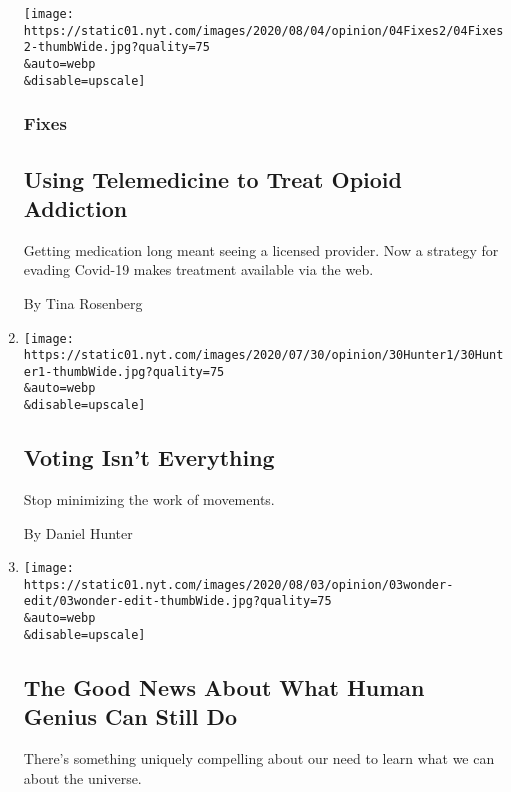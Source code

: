 \begin{enumerate}
  \texttt{[image: https://static01.nyt.com/images/2020/08/04/opinion/04Fixes2/04Fixes2-thumbWide.jpg?quality=75\\\&auto=webp\\\&disable=upscale]}

  \hypertarget{fixes}{%
  \subsubsection{Fixes}\label{fixes}}

  \hypertarget{using-telemedicine-to-treat-opioid-addiction}{%
  \subsection{Using Telemedicine to Treat Opioid
  Addiction}\label{using-telemedicine-to-treat-opioid-addiction}}

  Getting medication long meant seeing a licensed provider. Now a
  strategy for evading Covid-19 makes treatment available via the web.

  By Tina Rosenberg
\item
  \href{/2020/08/04/opinion/voting-2020-election-blm-movement.html}{}

  \texttt{[image: https://static01.nyt.com/images/2020/07/30/opinion/30Hunter1/30Hunter1-thumbWide.jpg?quality=75\\\&auto=webp\\\&disable=upscale]}

  \hypertarget{voting-isnt-everything-1}{%
  \subsection{Voting Isn't Everything}\label{voting-isnt-everything-1}}

  Stop minimizing the work of movements.

  By Daniel Hunter
\item
  \href{/2020/08/03/opinion/spacex-stonehenge-mars.html}{}

  \texttt{[image: https://static01.nyt.com/images/2020/08/03/opinion/03wonder-edit/03wonder-edit-thumbWide.jpg?quality=75\\\&auto=webp\\\&disable=upscale]}

  \hypertarget{the-good-news-about-what-human-genius-can-still-do}{%
  \subsection{The Good News About What Human Genius Can Still
  Do}\label{the-good-news-about-what-human-genius-can-still-do}}

  There's something uniquely compelling about our need to learn what we
  can about the universe.


\end{enumerate}
